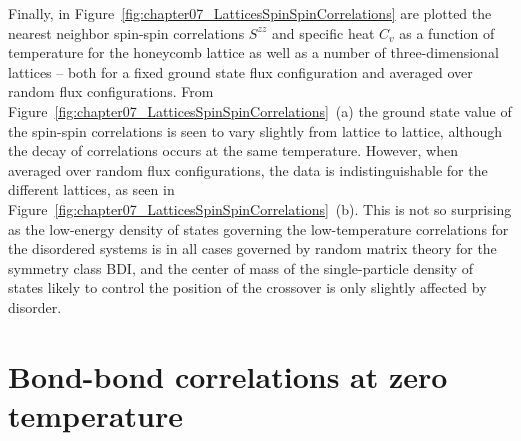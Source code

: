 Finally, in Figure~\ref{fig:chapter07_LatticesSpinSpinCorrelations} are plotted the nearest neighbor spin-spin correlations $S^{zz}$ and specific heat $C_v$ as a function of temperature for the honeycomb lattice as well as a number of three-dimensional lattices -- both for a fixed ground state flux configuration and averaged over random flux configurations.
From Figure~\ref{fig:chapter07_LatticesSpinSpinCorrelations}~(a) the ground state value of the spin-spin correlations is seen to vary slightly from lattice to lattice, although the decay of correlations occurs at the same temperature.
However, when averaged over random flux configurations, the data is indistinguishable for the different lattices, as seen in Figure~\ref{fig:chapter07_LatticesSpinSpinCorrelations}~(b).
This is not so surprising as the low-energy density of states governing the low-temperature correlations for the disordered systems is in all cases governed by random matrix theory for the symmetry class BDI, and the center of mass of the single-particle density of states likely to control the position of the crossover is only slightly affected by disorder.


%
%
\section[Bond-bond correlations at zero temperature]{Bond-bond correlations at zero temperature}
\label{section:chapter07_BondBondCorrelationsZeroTemperature}
%
%
